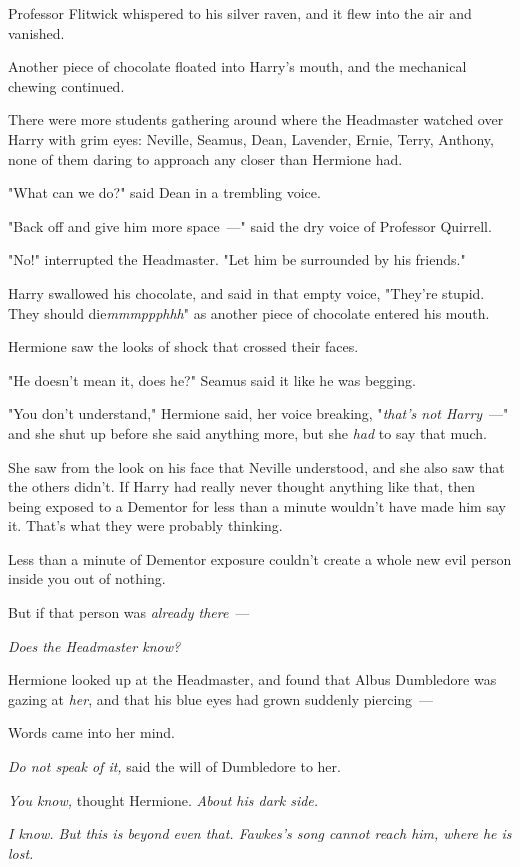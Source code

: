 Professor Flitwick whispered to his silver raven, and it flew into the air and
vanished.

Another piece of chocolate floated into Harry's mouth, and the mechanical
chewing continued.

There were more students gathering around where the Headmaster watched over
Harry with grim eyes: Neville, Seamus, Dean, Lavender, Ernie, Terry, Anthony,
none of them daring to approach any closer than Hermione had.

"What can we do?" said Dean in a trembling voice.

"Back off and give him more space~---" said the dry voice of Professor Quirrell.

"No!" interrupted the Headmaster. "Let him be surrounded by his friends."

Harry swallowed his chocolate, and said in that empty voice, "They're stupid.
They should die\emph{mmmppphhh}" as another piece of chocolate entered his
mouth.

Hermione saw the looks of shock that crossed their faces.

"He doesn't mean it, does he?" Seamus said it like he was begging.

"You don't understand," Hermione said, her voice breaking, "\emph{that's not
Harry}~---" and she shut up before she said anything more, but she \emph{had} to
say that much.

She saw from the look on his face that Neville understood, and she also saw
that the others didn't. If Harry had really never thought anything like that,
then being exposed to a Dementor for less than a minute wouldn't have made him
say it. That's what they were probably thinking.

Less than a minute of Dementor exposure couldn't create a whole new evil person
inside you out of nothing.

But if that person was \emph{already there}~---

\emph{Does the Headmaster know?}

Hermione looked up at the Headmaster, and found that Albus Dumbledore was
gazing at \emph{her}, and that his blue eyes had grown suddenly piercing~---

Words came into her mind.

\emph{Do not speak of it,} said the will of Dumbledore to her.

\emph{You know,} thought Hermione. \emph{About his dark side.}

\emph{I know. But this is beyond even that. Fawkes's song cannot reach him,
where he is lost.}

